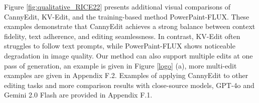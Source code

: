 \documentclass{article}
\begin{document}
Figure \ref{fig:qualitative_RICE22} presents additional visual comparisons of CannyEdit, KV-Edit, and the training-based method PowerPaint-FLUX. These examples demonstrate that CannyEdit achieves a strong balance between context fidelity, text adherence, and editing seamlessness. In contrast, KV-Edit often struggles to follow text prompts, while PowerPaint-FLUX shows noticeable degradation in image quality. Our method can also support multiple edits at one pass of generation, an example is given in Figure \ref{logo} (a), more multi-edit examples are given in Appendix F.2.  Examples of applying CannyEdit to other editing tasks and more comparison results with close-source models, GPT-4o \citep{OpenAI2025Introducing4O} and Gemini 2.0 Flash \citep{google_gemini2025} are provided in Appendix F.1.

 





















\end{document}
